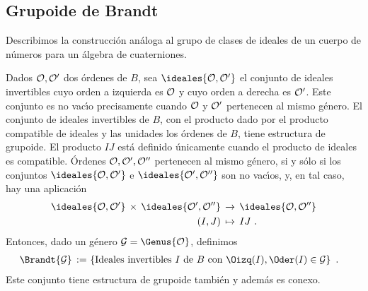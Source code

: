 

\subsection{Grupoide de Brandt}
Describimos la construcci\'{o}n an\'{a}loga al grupo de clases de ideales
de un cuerpo de n\'{u}meros para un \'{a}lgebra de cuaterniones.

Dados $\cal{O},\cal{O}'$ dos \'{o}rdenes de $B$, sea
$\ideales{\cal{O},\cal{O}'}$ el conjunto de ideales invertibles cuyo
orden a izquierda es $\cal{O}$ y cuyo orden a derecha es $\cal{O}'$.
Este conjunto es no vac\'{\i}o precisamente cuando $\cal{O}$ y $\cal{O}'$
pertenecen al mismo g\'{e}nero. El conjunto de ideales invertibles de $B$,
con el producto dado por el producto compatible de ideales y las
unidades los \'{o}rdenes de $B$, tiene estructura de grupoide.
El producto $IJ$ est\'{a} definido \'{u}nicamente cuando el producto de
ideales es compatible. \'{O}rdenes $\cal{O},\cal{O}',\cal{O}''$ pertenecen al
mismo g\'{e}nero, si y s\'{o}lo si los conjuntos
$\ideales{\cal{O},\cal{O}'}$ e $\ideales{\cal{O}',\cal{O}''}$ son no
vac\'{\i}os, y, en tal caso, hay una aplicaci\'{o}n
\begin{align*}
	\ideales{\cal{O},\cal{O}'}\,\times\,\ideales{\cal{O}',\cal{O}''}
	& \,\rightarrow\,\ideales{\cal{O},\cal{O}''} \\
	(I,J) & \,\mapsto\,IJ
	\text{ .}
\end{align*}
%
Entonces, dado un g\'{e}nero $\cal{G}=\Genus{\cal{O}}$, definimos
\begin{align*}
	\Brandt{\cal{G}} \,:=\, & \left\lbrace
	\text{Ideales invertibles } I\text{ de } B\text{ con }
	\Oizq(I),\Oder(I)\in\cal{G}\right\rbrace
	\text{ .}
\end{align*}
%
Este conjunto tiene estructura de grupoide tambi\'{e}n y adem\'{a}s es conexo.

